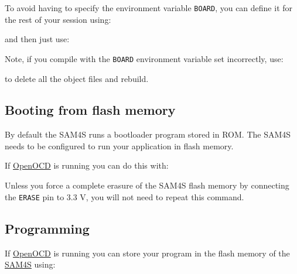To avoid having to specify the environment variable \texttt{BOARD}, you
can define it for the rest of your session using:
%
\begin{Shaded}
\begin{Highlighting}[]
\NormalTok{$ } 
\end{Highlighting}
\end{Shaded}
%
and then just use:
%
\begin{Shaded}
\begin{Highlighting}[]
\NormalTok{$ }
\end{Highlighting}
\end{Shaded}

Note, if you compile with the \texttt{BOARD} environment variable set incorrectly, use:
%
\begin{Shaded}
\begin{Highlighting}[]
\NormalTok{$ }
\NormalTok{$ }  
\end{Highlighting}
\end{Shaded}
%
to delete all the object files and rebuild.


\subsection{Booting from flash memory}
\label{booting-from-flash-memory}

By default the SAM4S runs a bootloader program stored in ROM. The SAM4S
needs to be configured to run your application in flash memory.

If \url{OpenOCD} is running you can do this with:

\begin{Shaded}
\begin{Highlighting}[]
\NormalTok{$ }
\end{Highlighting}
\end{Shaded}

Unless you force a complete erasure of the SAM4S flash memory by
connecting the \texttt{ERASE} pin to 3.3 V, you will not need to repeat
this command.

\subsection{Programming}
\label{programming}

If \url{OpenOCD} is running you can store your program in the flash
memory of the \url{SAM4S} using:

